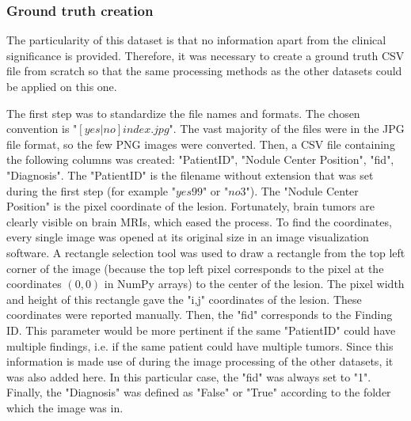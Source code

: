 \subsubsection{Ground truth creation}
\label{sec:braingroundtruth}
The particularity of this dataset is that no information apart from the clinical significance is provided. Therefore, it was necessary to create a ground truth CSV file from scratch so that the same processing methods as the other datasets could be applied on this one. 

The first step was to standardize the file names and formats. The chosen convention is "$[yes|no]{index}.jpg$". The vast majority of the files were in the JPG file format, so the few PNG images were converted. Then, a CSV file containing the following columns was created: "PatientID", "Nodule Center Position", "fid", "Diagnosis". The "PatientID" is the filename without extension that was set during the first step (for example "$yes99$" or "$no3$"). The "Nodule Center Position" is the pixel coordinate of the lesion. Fortunately, brain tumors are clearly visible on brain MRIs, which eased the process. To find the coordinates, every single image was opened at its original size in an image visualization software. A rectangle selection tool was used to draw a rectangle from the top left corner of the image (because the top left pixel corresponds to the pixel at the coordinates $(0,0)$ in NumPy arrays) to the center of the lesion. The pixel width and height of this rectangle gave the "i,j" coordinates of the lesion. These coordinates were reported manually. Then, the "fid" corresponds to the Finding ID. This parameter would be more pertinent if the same "PatientID" could have multiple findings, i.e. if the same patient could have multiple tumors. Since this information is made use of during the image processing of the other datasets, it was also added here. In this particular case, the "fid" was always set to "1". Finally, the "Diagnosis" was defined as "False" or "True" according to the folder which the image was in. 


